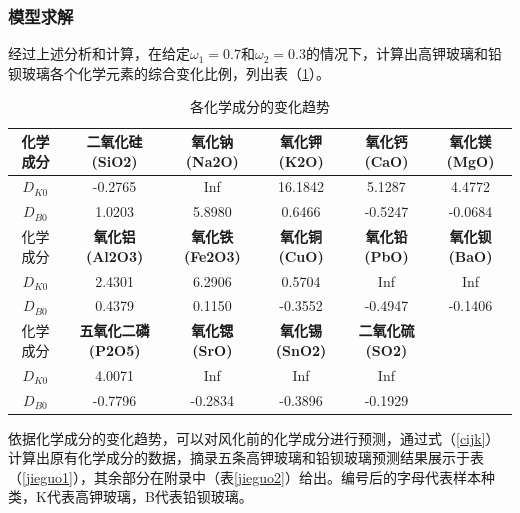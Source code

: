 \documentclass{my_paper}
\begin{document}
\subsubsection{模型求解}
经过上述分析和计算，在给定$ \omega_1 = 0.7 $和$ \omega_2=0.3    $的情况下，计算出高钾玻璃和铅钡玻璃各个化学元素的综合变化比例，列出表（\ref{bianhua}）。
\begin{table}[ht]
\centering
\caption{各化学成分的变化趋势}
\begin{tabular}{c|ccccc}
\toprule
化学成分                 & \multicolumn{1}{c}{\textbf{二氧化硅(SiO2)}}  & \multicolumn{1}{c}{\textbf{氧化钠(Na2O)}}  & \multicolumn{1}{c}{\textbf{氧化钾(K2O)}}  & \multicolumn{1}{c}{\textbf{氧化钙(CaO)}}  & \multicolumn{1}{c}{\textbf{氧化镁(MgO)}} \\\midrule
$D_{K0}$             &  -0.2765 & Inf      &16.1842 &5.1287 &4.4772\\ 
$D_{B0}$             &  1.0203 &5.8980 &0.6466 &-0.5247 &-0.0684\\\midrule
化学成分                 & \multicolumn{1}{c}{\textbf{氧化铝(Al2O3)}}  & \multicolumn{1}{c}{\textbf{氧化铁(Fe2O3)}} & \multicolumn{1}{c}{\textbf{氧化铜(CuO)}}  & \multicolumn{1}{c}{\textbf{氧化铅(PbO)}}  & \multicolumn{1}{c}{\textbf{氧化钡(BaO)}} \\\midrule
$D_{K0}$             & 2.4301 &6.2906  &0.5704   &Inf        &Inf \\
$D_{B0}$             &  0.4379 &0.1150 & -0.3552 &-0.4947 &-0.1406 \\\midrule
化学成分                 & \multicolumn{1}{c}{\textbf{五氧化二磷(P2O5)}} & \multicolumn{1}{c}{\textbf{氧化锶(SrO)}}   & \multicolumn{1}{c}{\textbf{氧化锡(SnO2)}} & \multicolumn{1}{c}{\textbf{二氧化硫(SO2)}} &                                       \\\midrule
$D_{K0}$             & 4.0071 &Inf         &Inf         &Inf \\
$D_{B0}$             &  -0.7796 &-0.2834 &-0.3896 &-0.1929\\
\bottomrule
  \end{tabular}
\label{bianhua}
  \end{table}

依据化学成分的变化趋势，可以对风化前的化学成分进行预测，通过式（\ref{cijk}）计算出原有化学成分的数据，摘录五条高钾玻璃和铅钡玻璃预测结果展示于表（\ref{jieguo1}），其余部分在附录中（表\ref{jieguo2}）给出。编号后的字母代表样本种类，K代表高钾玻璃，B代表铅钡玻璃。
\end{document}
